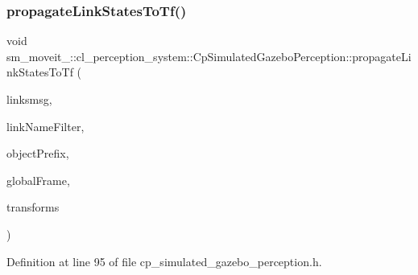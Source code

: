 \subsubsection{\texorpdfstring{propagate\+Link\+States\+To\+Tf()}{propagateLinkStatesToTf()}}
{\footnotesize\ttfamily void sm\+\_\+moveit\+\_\+::cl\+\_\+perception\+\_\+system\+::\+Cp\+Simulated\+Gazebo\+Perception\+::propagate\+Link\+States\+To\+Tf (\begin{DoxyParamCaption}\item[{const gazebo\+\_\+msgs\+::\+Link\+States \&}]{linksmsg,  }\item[{std\+::string}]{link\+Name\+Filter,  }\item[{std\+::string}]{object\+Prefix,  }\item[{std\+::string}]{global\+Frame,  }\item[{std\+::vector$<$ tf\+::\+Stamped\+Transform $>$ \&}]{transforms }\end{DoxyParamCaption})\hspace{0.3cm}{\ttfamily [inline]}}



Definition at line 95 of file cp\+\_\+simulated\+\_\+gazebo\+\_\+perception.\+h.


